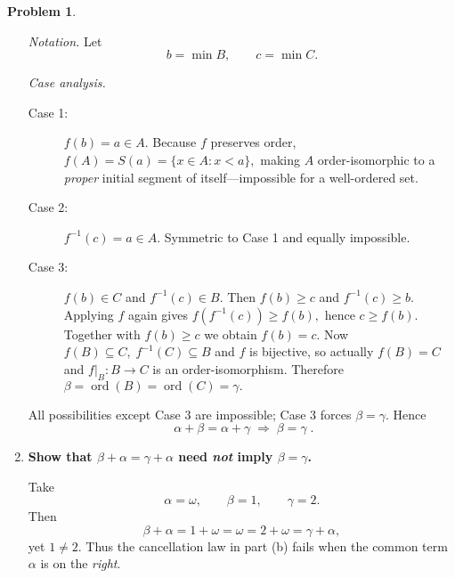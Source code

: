 \documentclass[12pt]{article}
\theoremstyle{definition} %
\newtheorem{problem}{Problem}
\theoremstyle{plain} %
\begin{document}
\begin{problem}
\begin{enumerate}
          \smallskip
          \emph{Notation.}\;
          Let
          \[
              b=\min B,\qquad
              c=\min C .
          \]

          \smallskip
          \emph{Case analysis.}

          \begin{description}
              \item[Case 1:] $f(b)=a\in A$.  
                  Because $f$ preserves order,
                  \(
                      f(A)=S(a)=\{x\in A:x<a\},
                  \)
                  making $A$ order-isomorphic to a \emph{proper} initial
                  segment of itself—impossible for a well-ordered set.
              \item[Case 2:] $f^{-1}(c)=a\in A$.  
                  Symmetric to Case 1 and equally impossible.
              \item[Case 3:] $f(b)\in C$ and $f^{-1}(c)\in B$.  
                  Then $f(b)\ge c$ and $f^{-1}(c)\ge b$.
                  Applying $f$ again gives
                  \(
                      f(f^{-1}(c))\ge f(b),
                  \)
                  hence $c\ge f(b)$.  
                  Together with $f(b)\ge c$ we obtain $f(b)=c$.
                  Now
                  \(
                      f(B)\subseteq C,\;
                      f^{-1}(C)\subseteq B
                  \)
                  and $f$ is bijective, so actually $f(B)=C$ and
                  $f|_{B}:B\to C$ is an order-isomorphism.  
                  Therefore
                  \(
                      \beta=\operatorname{ord}(B)=\operatorname{ord}(C)=\gamma.
                  \)
          \end{description}

          All possibilities except Case 3 are impossible; Case 3 forces
          $\beta=\gamma$.  Hence
          \[
              \boxed{\;\alpha+\beta=\alpha+\gamma\;\Longrightarrow\;
              \beta=\gamma\;}.
          \]

    \item \textbf{Show that $\beta+\alpha=\gamma+\alpha$ need \emph{not}
          imply $\beta=\gamma$.}

          Take
          \[
              \alpha=\omega,\qquad
              \beta=1,\qquad
              \gamma=2 .
          \]
          Then
          \[
              \beta+\alpha
              =1+\omega
              =\omega
              =2+\omega
              =\gamma+\alpha,
          \]
          yet $1\neq2$.  Thus the cancellation law in part (b) fails
          when the common term $\alpha$ is on the \emph{right}.
          \qedhere
    \end{enumerate}
\end{problem}
\end{document}
